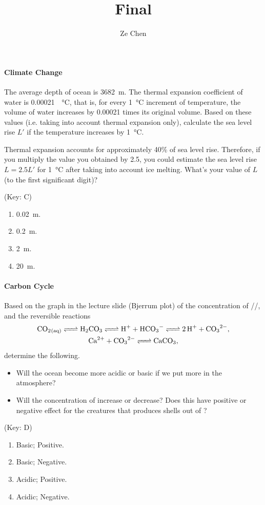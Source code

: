 \documentclass{article}
\title{Final}
\author{Ze Chen}
\begin{document}
\maketitle

\paragraph*{Climate Change}
The average depth of ocean is \SI{3682}{\meter}.
The thermal expansion coefficient of water is \SI{0.00021}{\per\degreeCelsius}, that is, for every \SI{1}{\degreeCelsius} increment of temperature, the volume of water increases by \num{0.00021} times its original volume.
Based on these values (i.e. taking into account thermal expansion only), calculate the sea level rise $L'$ if the temperature increases by \SI{1}{\degreeCelsius}.
\par
Thermal expansion accounts for approximately 40\% of sea level rise.
Therefore, if you multiply the value you obtained by \num{2.5}, you could estimate the sea level rise $L = 2.5L'$ for \SI{1}{\degreeCelsius} after taking into account ice melting.
What's your value of $L$ (to the first significant digit)?
\par
(Key: C)
\begin{enumerate}[label=\Alph*.]
   \item \SI{0.02}{\meter}.
   \item \SI{0.2}{\meter}.
   \item \SI{2}{\meter}.
   \item \SI{20}{\meter}.
\end{enumerate}

\paragraph*{Carbon Cycle}
Based on the graph in the lecture slide (Bjerrum plot) of the concentration of //, and the reversible reactions
\begin{gather*}
    \ce{CO2_{(aq)} <=> H2CO3 <=> H^+ + HCO3- <=> 2H^+ + CO3^{2}-}, \\
    \ce{Ca^{2}+ + CO3^{2}- <=> CaCO3},
\end{gather*}
determine the following.
\begin{itemize}
    \item Will the ocean become more acidic or basic if we put more  in the atmosphere?
    \item Will the concentration of  increase or decrease?
    Does this have positive or negative effect for the creatures that produces shells out of ?
\end{itemize}
\par
(Key: D)
\begin{enumerate}[label=\Alph*.]
    \item Basic; Positive.
    \item Basic; Negative.
    \item Acidic; Positive.
    \item Acidic; Negative.
\end{enumerate}
\end{document}
